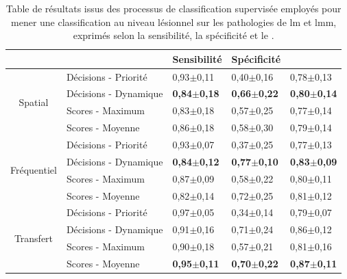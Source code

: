\begin{table}[H]
    \centering
    \begin{tabular}{cllll}
        \toprule
        \multicolumn{1}{l}{}         &                              & Sensibilité               & Spécificité               & \Fscore{}                 \\ \midrule
        \multirow{4}{*}{Spatial}     & Décisions - Priorité         & 0,93$\pm$0,11             & 0,40$\pm$0,16             & 0,78$\pm$0,13             \\
                                     & Décisions - Dynamique        & \textbf{0,84$\pm$0,18}    & \textbf{0,66$\pm$0,22}    & \textbf{0,80$\pm$0,14}    \\
                                     & Scores - Maximum             & 0,83$\pm$0,18             & 0,57$\pm$0,25             & 0,77$\pm$0,14             \\
                                     & Scores - Moyenne             & 0,86$\pm$0,18             & 0,58$\pm$0,30             & 0,79$\pm$0,14             \\ \midrule
        \multirow{4}{*}{Fréquentiel} & Décisions - Priorité         & 0,93$\pm$0,07             & 0,37$\pm$0,25             & 0,77$\pm$0,13             \\
                                     & Décisions - Dynamique        & \textbf{0,84$\pm$0,12}    & \textbf{0,77$\pm$0,10}    & \textbf{0,83$\pm$0,09}    \\
                                     & Scores - Maximum             & 0,87$\pm$0,09             & 0,58$\pm$0,22             & 0,80$\pm$0,11             \\
                                     & Scores - Moyenne             & 0,82$\pm$0,14             & 0,72$\pm$0,25             & 0,81$\pm$0,12             \\ \midrule
        \multirow{4}{*}{Transfert}   & Décisions - Priorité         & 0,97$\pm$0,05             & 0,34$\pm$0,14             & 0,79$\pm$0,07             \\
                                     & Décisions - Dynamique        & 0,91$\pm$0,16             & 0,71$\pm$0,24             & 0,86$\pm$0,12             \\
                                     & Scores - Maximum             & 0,90$\pm$0,18             & 0,57$\pm$0,21             & 0,81$\pm$0,16             \\
                                     & Scores - Moyenne             & \textbf{0,95$\pm$0,11}    & \textbf{0,70$\pm$0,22}    & \textbf{0,87$\pm$0,11}    \\ \bottomrule
    \end{tabular}
    \caption{Table de résultats issus des processus de classification supervisée employés pour mener une classification au niveau lésionnel sur les pathologies de \gls{lm} et \gls{lmm}, exprimés selon la sensibilité, la spécificité et le \fscore{}.}
    \label{tab:results_lesion_classification_supervised_patient_lm}
\end{table}

